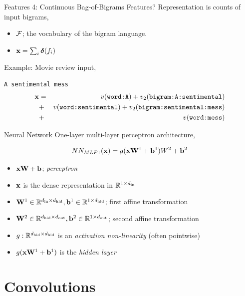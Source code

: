 \documentclass{beamer}
\begin{document}
\begin{frame}{Features 4: Continuous Bag-of-Bigrams Features?}
  Representation is counts of input bigrams, 
  \begin{itemize}
  \item $\mathcal{F}$; the vocabulary of the bigram language.
  \item $\mathbf{x} = \sum_{i} \boldsymbol{\delta}(f_i)$ 
  \end{itemize}

  Example: Movie review input, 
  \begin{center}
    \texttt{A sentimental mess}
    \begin{eqnarray*}
      \mathbf{x} &=& v(\texttt{word:A})+ v_2(\texttt{bigram:A:sentimental}) \\
      &+&  v(\texttt{word:sentimental}) +   v_2(\texttt{bigram:sentimental:mess})  \\
      &+& v(\texttt{word:mess})
    \end{eqnarray*}

  \end{center}
\end{frame}

\begin{frame}{Neural Network}
  One-layer multi-layer perceptron architecture,

  \[NN_{MLP1}(\mathbf{x}) =  g(\mathbf{x}\mathbf{W}^1 + \mathbf{b}^1)W^2 + \mathbf{b}^2\]
  \begin{itemize}
  \item $\mathbf{x}\mathbf{W} + \mathbf{b}$; \textit{perceptron}
  \item $\mathbf{x}$ is the dense representation in $\mathbb{R}^{1 \times {d_{\mathrm{in}}}}$
  \item $\mathbf{W}^1 \in \mathbb{R}^{{d_{\mathrm{in}}} \times {d_{\mathrm{hid}}}}, \mathbf{b}^1 \in \mathbb{R}^{1 \times {d_{\mathrm{hid}}}}$; first affine transformation
  \item $\mathbf{W}^2 \in \mathbb{R}^{{d_{\mathrm{hid}}} \times {d_{\mathrm{out}}}}, \mathbf{b}^2 \in \mathbb{R}^{1 \times {d_{\mathrm{out}}}}$; second affine transformation
  \item $g:\mathbb{R}^{{d_{\mathrm{hid}}} \times {d_{\mathrm{hid}}}}$ is an \textit{activation non-linearity} (often pointwise)
  \item $g(\mathbf{x}\mathbf{W}^1 + \mathbf{b}^1)$ is the \textit{hidden layer}
  \end{itemize}
\end{frame}
\section{Convolutions} 
\end{document}
